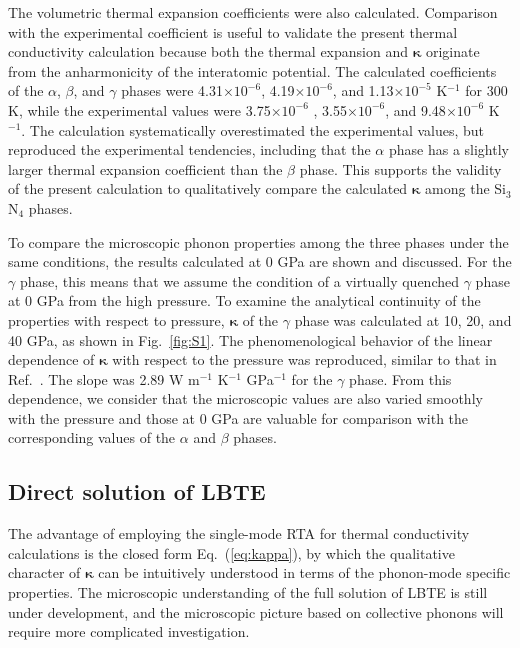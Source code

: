 \documentclass[twocolumn,amsmath,amssymb,a4paper,prb,superscriptaddress,floatfix]{revtex4-1}
\begin{document}
The volumetric thermal expansion coefficients were also calculated. 
Comparison with the experimental coefficient is useful to validate the present
thermal conductivity calculation because both the thermal expansion
and $\boldsymbol{\kappa}$ originate from the anharmonicity of the interatomic
potential.
The calculated coefficients of the $\alpha$, $\beta$, and $\gamma$ phases were
4.31$\times 10^{-6}$,  4.19$\times 10^{-6}$, and 1.13$\times 10^{-5}$
K$^{-1}$
for 300 K, while the experimental values\cite{minikayev-alpha, gamma-expand}
were 3.75$\times 10^{-6}$ , 3.55$\times 10^{-6}$, and 9.48$\times
10^{-6}$ K$^{-1}$. The calculation systematically overestimated the experimental
values, but reproduced the experimental tendencies, including that the $\alpha$
phase has a slightly larger thermal expansion coefficient than the $\beta$
phase. This supports the validity of the present calculation to qualitatively
compare the calculated $\boldsymbol{\kappa}$ among the Si$_3$N$_4$ phases.

To compare the microscopic phonon properties among the three phases under the
same conditions, the results calculated at 0 GPa are shown and discussed.  For
the $\gamma$ phase, this means that we assume the condition of a virtually
quenched $\gamma$ phase at 0 GPa from the high pressure. To examine the
analytical continuity of the properties with respect to pressure,
$\boldsymbol{\kappa}$ of the $\gamma$ phase was calculated at 10, 20, and 40
GPa, as shown in Fig.~\ref{fig:S1}. The phenomenological behavior of the linear
dependence of $\boldsymbol{\kappa}$ with respect to the pressure was reproduced,
similar to that in Ref.~. The slope was 2.89
W m$^{-1}$ K$^{-1}$ GPa$^{-1}$ for the $\gamma$ phase.  From this dependence, we
consider that the microscopic values are also varied smoothly with the pressure
and those at 0 GPa are valuable for comparison with the corresponding values of
the $\alpha$ and $\beta$ phases.

\subsection{Direct solution of LBTE}

The advantage of employing the single-mode RTA for thermal conductivity
calculations is the closed form Eq.~(\ref{eq:kappa}), by which the qualitative character of
$\boldsymbol{\kappa}$ can be intuitively understood in terms of the phonon-mode
specific properties. The microscopic understanding of the full solution of LBTE
is still under development,\cite{cepellotti-relaxons} and the microscopic
picture based on collective phonons\cite{hardy-collective} will require more
complicated investigation.
\end{document}

